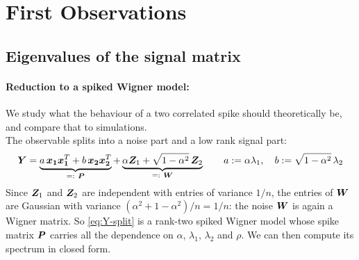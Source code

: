 \documentclass[11pt]{article}
\begin{document}
\section{First Observations}

\subsection{Eigenvalues of the signal matrix}

\paragraph{Reduction to a spiked Wigner model:}
We study what the behaviour of a two correlated spike should theoretically be, and compare that to simulations.\\
The observable splits into a noise part and a low rank signal part:
\begin{equation}
    \rdmmat Y = \underbrace{a\,\vect{x_1}\vect{x_1}^T + b\,\vect{x_2}\vect{x_2}^T}_{=:\ \rdmmat P}
              + \underbrace{\alpha \rdmmat Z_1 + \sqrt{1-\alpha^2}\,\rdmmat Z_2}_{=:\ \rdmmat W}
    \qquad
    a := \alpha\lambda_1, \quad b := \sqrt{1-\alpha^2}\,\lambda_2
    \label{eq:Y-split}
\end{equation}
Since $\bm{Z}_1$ and $\bm{Z}_2$ are independent with entries of variance $1/n$, the entries of $\bm{W}$ are Gaussian with variance $(\alpha^2 + 1 - \alpha^2)/n = 1/n$: the noise $\bm{W}$ is again a Wigner matrix. So \eqref{eq:Y-split} is a rank-two spiked Wigner model whose spike matrix $\bm{P}$ carries all the dependence on $\alpha$, $\lambda_1$, $\lambda_2$ and $\rho$. We can then compute its spectrum in closed form.
\end{document}
